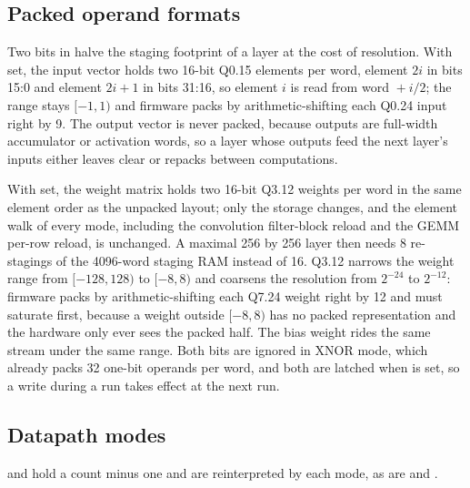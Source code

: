 \subsection{Packed operand formats}

Two bits in  halve the staging footprint of a layer at the cost of resolution. With  set, the input vector holds two 16-bit Q0.15 elements per word, element $2i$ in bits 15:0 and element $2i+1$ in bits 31:16, so element $i$ is read from word ${} + i/2$; the range stays $[-1, 1)$ and firmware packs by arithmetic-shifting each Q0.24 input right by 9. The output vector is never packed, because outputs are full-width accumulator or activation words, so a layer whose outputs feed the next layer's inputs either leaves  clear or repacks between computations.

With  set, the weight matrix holds two 16-bit Q3.12 weights per word in the same element order as the unpacked layout; only the storage changes, and the element walk of every mode, including the convolution filter-block reload and the GEMM per-row reload, is unchanged. A maximal 256 by 256 layer then needs 8 re-stagings of the 4096-word staging RAM instead of 16. Q3.12 narrows the weight range from $[-128, 128)$ to $[-8, 8)$ and coarsens the resolution from $2^{-24}$ to $2^{-12}$: firmware packs by arithmetic-shifting each Q7.24 weight right by 12 and must saturate first, because a weight outside $[-8, 8)$ has no packed representation and the hardware only ever sees the packed half. The bias weight rides the same stream under the same range. Both bits are ignored in XNOR mode, which already packs 32 one-bit operands per word, and both are latched when  is set, so a write during a run takes effect at the next run.

\subsection{Datapath modes}

 and  hold a count minus one and are reinterpreted by each mode, as are  and .

